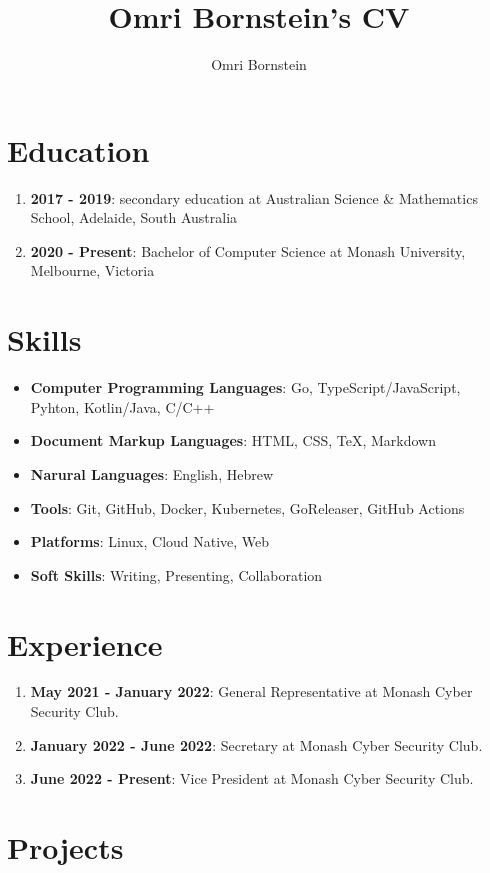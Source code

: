 \documentclass[a4paper]{article}
\title{Omri Bornstein's CV}
\author{Omri Bornstein}
\begin{document}
	\section*{Education}

	\begin{enumerate}
		\item \textbf{2017 - 2019}: secondary education at Australian Science \& Mathematics School, Adelaide, South Australia
		\item \textbf{2020 - Present}: Bachelor of Computer Science at Monash University, Melbourne, Victoria
	\end{enumerate}

	\section*{Skills}

	\begin{itemize}
		\item \textbf{Computer Programming Languages}: Go, TypeScript/JavaScript, Pyhton, Kotlin/Java, C/C++
		\item \textbf{Document Markup Languages}: HTML, CSS, \TeX, Markdown
		\item \textbf{Narural Languages}: English, Hebrew
		\item \textbf{Tools}: Git, GitHub, Docker, Kubernetes, GoReleaser, GitHub Actions
		\item \textbf{Platforms}: Linux, Cloud Native, Web
		\item \textbf{Soft Skills}: Writing, Presenting, Collaboration
	\end{itemize}

	\section*{Experience}

	\begin{enumerate}
		\item \textbf{May 2021 - January 2022}: General Representative at Monash Cyber Security Club.
		\item \textbf{January 2022 - June 2022}: Secretary at Monash Cyber Security Club.
		\item \textbf{June 2022 - Present}: Vice President at Monash Cyber Security Club.
	\end{enumerate}

	\section*{Projects}
\end{document}
